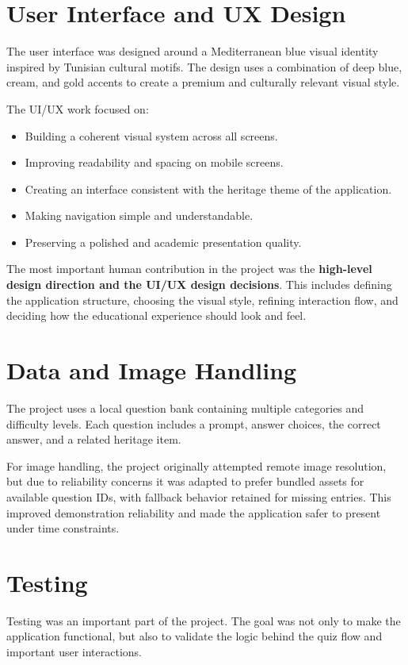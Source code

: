 \documentclass[12pt,a4paper]{article}
\begin{document}
\section{User Interface and UX Design}
The user interface was designed around a Mediterranean blue visual identity inspired by Tunisian cultural motifs. The design uses a combination of deep blue, cream, and gold accents to create a premium and culturally relevant visual style.

The UI/UX work focused on:

\begin{itemize}[leftmargin=1.5em]
    \item Building a coherent visual system across all screens.
    \item Improving readability and spacing on mobile screens.
    \item Creating an interface consistent with the heritage theme of the application.
    \item Making navigation simple and understandable.
    \item Preserving a polished and academic presentation quality.
\end{itemize}

The most important human contribution in the project was the \textbf{high-level design direction and the UI/UX design decisions}. This includes defining the application structure, choosing the visual style, refining interaction flow, and deciding how the educational experience should look and feel.

\section{Data and Image Handling}
The project uses a local question bank containing multiple categories and difficulty levels. Each question includes a prompt, answer choices, the correct answer, and a related heritage item.

For image handling, the project originally attempted remote image resolution, but due to reliability concerns it was adapted to prefer bundled assets for available question IDs, with fallback behavior retained for missing entries. This improved demonstration reliability and made the application safer to present under time constraints.

\section{Testing}
Testing was an important part of the project. The goal was not only to make the application functional, but also to validate the logic behind the quiz flow and important user interactions.
\end{document}
